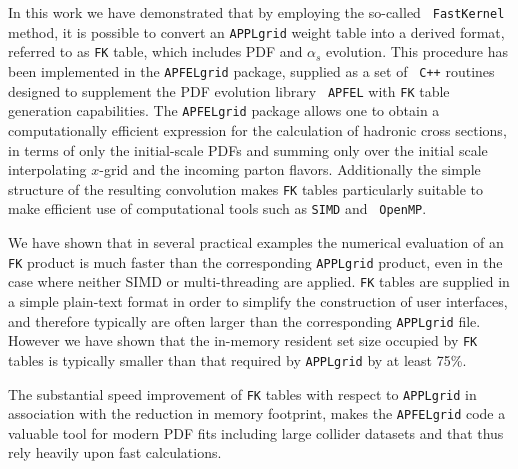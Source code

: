 \documentclass[preprint,12pt]{elsarticle}
\begin{document}
In this work we have demonstrated that by employing the so-called {\tt
  FastKernel} method, it is possible to convert an {\tt APPLgrid}
weight table into a derived format, referred to as {\tt FK} table,
which includes PDF and $\alpha_s$ evolution. This procedure has been
implemented in the {\tt APFELgrid} package, supplied as a set of {\tt
  C++} routines designed to supplement the PDF evolution library {\tt
  APFEL} with {\tt FK} table generation capabilities.
The {\tt APFELgrid} package allows one to obtain a computationally
efficient expression for the calculation of hadronic cross sections,
in terms of only the initial-scale PDFs and summing only over the
initial scale interpolating $x$-grid and the incoming parton
flavors. Additionally the simple structure of the resulting
convolution makes {\tt FK} tables particularly suitable to make
efficient use of computational tools such as {\tt SIMD} and {\tt
  OpenMP}.

We have shown that in several practical examples the numerical
evaluation of an {\tt FK} product is much faster than the
corresponding {\tt APPLgrid} product, even in the case where neither
SIMD or multi-threading are applied. {\tt FK} tables are supplied in a
simple plain-text format in order to simplify the construction of user
interfaces, and therefore typically are often larger than the
corresponding {\tt APPLgrid} file. However we have shown that the
in-memory resident set size occupied by {\tt FK} tables is typically
smaller than that required by {\tt APPLgrid} by at least 75\%.

The substantial speed improvement of {\tt FK} tables with respect to
{\tt APPLgrid} in association with the reduction in memory footprint,
makes the {\tt APFELgrid} code a valuable tool for modern PDF fits
including large collider datasets and that thus rely heavily upon fast
calculations.

\end{document}
